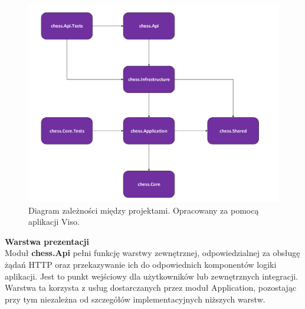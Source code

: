 \documentclass[12pt,a4paper]{article}
\begin{document}
\vspace{0.5cm}
\begin{figure}[h!]
    \centering
    \includegraphics[width=1\textwidth]{images/diagram_dependencies.png}
    \caption{Diagram zależności między projektami. Opracowany za pomocą aplikacji Viso.}
\end{figure}

\newpage

\noindent \textbf{Warstwa prezentacji}\\
Moduł \textbf{chess.Api} pełni funkcję warstwy zewnętrznej, odpowiedzialnej za obsługę żądań HTTP oraz przekazywanie ich do odpowiednich komponentów logiki aplikacji. Jest to punkt wejściowy dla użytkowników lub zewnętrznych integracji. Warstwa ta korzysta z usług dostarczanych przez moduł Application, pozostając przy tym niezależna od szczegółów implementacyjnych niższych warstw.
\end{document}
